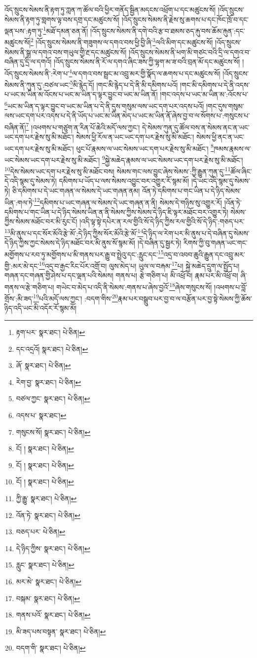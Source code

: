 འོད་སྲུངས་སེམས་ནི་རྟག་ཏུ་ཀླན་ཀ་ཚོལ་བའི་ཕྱིར་གནོད་སྦྱིན་མདངས་འཕྲོག་པ་དང་མཚུངས་སོ། །འོད་སྲུངས་སེམས་ནི་རྟག་ཏུ་གླགས་ལྟ་བས་དགྲ་དང་མཚུངས་སོ། །འོད་སྲུངས་སེམས་ནི་རྗེས་སུ་ཆགས་པ་དང་ཁོང་ཁྲོ་བ་དང་ལྡན་པས་:རྟག་ཏུ་\footnote{རྟག་པར་  སྣར་ཐང་།  པེ་ཅིན། }མཐོ་དམན་ཅན་ནོ། །འོད་སྲུངས་སེམས་ནི་དགེ་བའི་རྩ་བ་ཐམས་ཅད་རྐུ་བས་ཆོམ་རྐུན་:དང་མཚུངས་སོ།\footnote{དང་འདྲའོ།  སྣར་ཐང་།  པེ་ཅིན། } །འོད་སྲུངས་སེམས་ནི་གཟུགས་ལ་དགའ་བས་ཕྱི་བྱི་ཞི་\footnote{ཞོ་  སྣར་ཐང་།  པེ་ཅིན། }ལའི་མིག་དང་མཚུངས་སོ། །འོད་སྲུངས་སེམས་ནི་སྒྲ་ལ་དགའ་བས་གཡུལ་གྱི་རྔ་དང་མཚུངས་སོ། །འོད་སྲུངས་སེམས་ནི་ཕག་མི་གཙང་བའི་དྲི་ལ་དགའ་བ་བཞིན་དུ་དྲི་ལ་དགའོ། །འོད་སྲུངས་སེམས་ནི་རོ་ལ་དགའ་ཞིང་ཟས་ཀྱི་ལྷག་མ་ཟ་བའི་བྲན་མོ་དང་མཚུངས་སོ། །འོད་སྲུངས་སེམས་ནི་:རེག་པ་\footnote{རེག་བྱ་  སྣར་ཐང་།  པེ་ཅིན། }ལ་དགའ་བས་སྦྲང་མ་འབྲུ་མར་གྱི་སྣོད་ལ་ཆགས་པ་དང་མཚུངས་སོ། །འོད་སྲུངས་སེམས་ནི་ཀུན་དུ་:བཙལ་ཡང་\footnote{བཙལ་ཀྱང་  སྣར་ཐང་།  པེ་ཅིན། }མི་རྙེད་དོ། །གང་མི་རྙེད་པ་དེ་ནི་མི་དམིགས་པའོ། །གང་མི་དམིགས་པ་དེ་ནི་འདས་པ་ཡང་མ་ཡིན་མ་འོངས་པ་ཡང་མ་ཡིན་ད་ལྟར་བྱུང་བ་ཡང་མ་ཡིན་ནོ། །གང་འདས་པ་ཡང་མ་ཡིན་མ་:འོངས་པ་\footnote{འདས་པ་  སྣར་ཐང་། }ཡང་མ་ཡིན་ད་ལྟར་བྱུང་བ་ཡང་མ་ཡིན་པ་དེ་ནི་དུས་གསུམ་ལས་ཡང་དག་པར་འདས་པའོ། །གང་དུས་གསུམ་ལས་ཡང་དག་པར་འདས་པ་དེ་ནི་ཡོད་པ་ཡང་མ་ཡིན་མེད་པ་ཡང་མ་ཡིན་ནོ་ཞེས་བྱ་བ་ལ་སོགས་པ་:གསུངས་པ་བཞིན་ནོ།\footnote{གསུངས་སོ།  སྣར་ཐང་།  པེ་ཅིན། } །འཕགས་པ་གཙུག་ན་རིན་པོ་ཆེའི་མདོ་ལས་ཀྱང་། དེ་སེམས་ཀུན་དུ་ཚོལ་བས་ན་སེམས་ནང་ན་ཡང་ཡང་དག་པར་རྗེས་སུ་མི་མཐོང་། སེམས་ཕྱི་རོལ་ན་ཡང་ཡང་དག་པར་རྗེས་སུ་མི་མཐོང་། སེམས་ཕྱི་ནང་ན་ཡང་ཡང་དག་པར་རྗེས་སུ་མི་མཐོང་། ཕུང་པོ་རྣམས་ལ་ཡང་སེམས་ཡང་དག་པར་རྗེས་སུ་མི་མཐོང་། \footnote{ངོ། །   སྣར་ཐང་།  པེ་ཅིན། }ཁམས་རྣམས་ལ་ཡང་སེམས་ཡང་དག་པར་རྗེས་སུ་མི་མཐོང་། \footnote{ངོ། །   སྣར་ཐང་།  པེ་ཅིན། }སྐྱེ་མཆེད་རྣམས་ལ་ཡང་སེམས་ཡང་དག་པར་རྗེས་སུ་མི་མཐོང་། \footnote{ངོ། །   སྣར་ཐང་།  པེ་ཅིན། }དེས་སེམས་ཡང་དག་པར་རྗེས་སུ་མི་མཐོང་བས། སེམས་གང་ལས་བྱུང་ཞེས་སེམས་:ཀྱི་རྒྱུན་ཀུན་དུ་\footnote{ཀྱི་རྒྱུ་  སྣར་ཐང་།  པེ་ཅིན། }ཚོལ་ཞིང་དེ་འདི་སྙམ་དུ་སེམས་ཏེ། དམིགས་པ་ཡོད་པ་ལས་སེམས་འབྱུང་བར་འགྱུར་རོ་སྙམ་མོ། །དེ་ཡང་འདི་སྙམ་དུ་སེམས་ཏེ། ཅི་དམིགས་པ་དེ་ཡང་གཞན་ལ་སེམས་དེ་ཡང་གཞན་ནམ། འོན་ཏེ་དམིགས་པ་གང་ཡིན་པ་དེ་ཉིད་སེམས་ཡིན་:གལ་ཏེ་\footnote{འོན་ཏེ་  སྣར་ཐང་།  པེ་ཅིན། }དམིགས་པ་ཡང་གཞན་ལ་སེམས་དེ་ཡང་གཞན་ན་ནི། སེམས་དེ་གཉིས་སུ་འགྱུར་རོ། །འོན་ཏེ་དམིགས་པ་གང་ཡིན་པ་དེ་ཉིད་སེམས་ཡིན་ན་ནི་སེམས་ཀྱིས་སེམས་དེ་ཉིད་ཇི་ལྟར་མཐོང་བར་འགྱུར་ཏེ། སེམས་ཀྱིས་སེམས་མཐོང་བར་མི་རུང་ངོ། །འདི་ལྟ་སྟེ་དཔེར་ན་རལ་གྱིའི་སོ་དེ་ཉིད་ཀྱིས་རལ་གྱིའི་སོ་དེ་ཉིད་:གཅད་པར་\footnote{བཅད་པར་  པེ་ཅིན། }མི་ནུས་པ་དང་སོར་མོའི་རྩེ་མོ་:དེ་ཉིད་ཀྱིས་སོར་མོའི་རྩེ་མོ་\footnote{དེ་ཉིད་ཀྱིས་  སྣར་ཐང་།  པེ་ཅིན། }དེ་ཉིད་ལ་རེག་པར་མི་ནུས་པ་དེ་བཞིན་དུ་སེམས་དེ་ཉིད་ཀྱིས་ཀྱང་སེམས་དེ་ཉིད་མཐོང་བར་མི་ནུས་སོ་སྙམ་མོ། །དེ་བཞིན་དུ་སྦྱར་ཏེ། རིགས་ཀྱི་བུ་གཞན་ཡང་གང་མགྱོགས་པ་རབ་ཏུ་མགྱོགས་པ་མི་གནས་པར་རྒྱུ་བ་སྤྲེའུ་དང་:རླུང་དང་\footnote{རླུང་  སྣར་ཐང་།  པེ་ཅིན། }འདྲ་བ་འབབ་ཆུའི་རྒྱུན་དང་འབྲུ་མར་གྱི་:མར་མེ་དང་\footnote{མར་མེ་  སྣར་ཐང་།  པེ་ཅིན། }འདྲ་བ་རྒྱང་རིང་པོར་འགྲོ་བ། ལུས་མེད་པ། ཡུལ་ལ་བརྐམ་\footnote{བསྐམ་  སྣར་ཐང་།  པེ་ཅིན། }པ། སྐྱེ་མཆེད་དྲུག་ལ་སྤྱོད་པ། གཞན་དང་གཞན་གྱི་ཤེས་པ་དང་ལྡན་པའི་སེམས། གནས་པ། རྩེ་གཅིག་པ། མི་འཕྲོ་བ། རྣམ་པར་མི་འཕྲོ་བ། ཞི་གནས་ལ་རྩེ་གཅིག་པ། གཡེང་བ་མེད་པ་འདི་ནི་སེམས་:གནས་པ་ཞེས་བྱའོ་\footnote{གནས་པའོ་  སྣར་ཐང་།  པེ་ཅིན། }ཞེས་གསུངས་སོ། །འཕགས་པ་བློ་གྲོས་:མི་ཟད་\footnote{མི་ཟད་པས་བསྟན་  སྣར་ཐང་།  པེ་ཅིན། }པའི་མདོ་ལས་ཀྱང་། :བདག་གིས་\footnote{བདག་གི་  སྣར་ཐང་།  པེ་ཅིན། }རྣམ་པར་བསྒྲུབ་པར་བྱ་བ་ལ་བརྩོན་པར་བྱ་སྟེ་སེམས་ཀྱི་ཆོས་ཉིད་འདི་ཡང་མི་འདོར་རོ་སྙམ་མོ། 